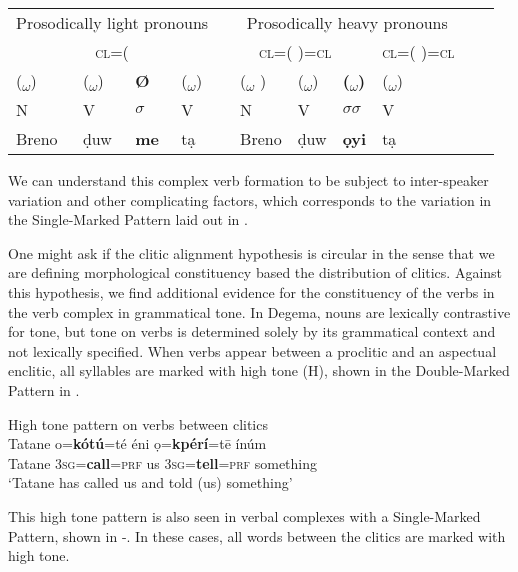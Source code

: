 \documentclass[output=paper]{langsci/langscibook}
\begin{document}
\ea\label{ex:rolle:48}
\begin{tabular}{lllllllllll}
\multicolumn{4}{c}{Prosodically light pronouns}  
&&
\multicolumn{4}{c}{Prosodically heavy pronouns}
\\  
\multicolumn{4}{c}{\textsc{cl}=( }       )=\textsc{cl} 
&
\multicolumn{4}{c}{\textsc{cl}=({ })=\textsc{cl}}  & \textsc{cl}=(  )=\textsc{cl}
\\
(\textsubscript{$\omega $}) &
(\textsubscript{$\omega $}) &
\textbf{Ø}  &
(\textsubscript{$\omega $}) & 
& 
(\textsubscript{$\omega $} ) &
(\textsubscript{$\omega $}) &
\textbf{(\textsubscript{$\omega $})} &
(\textsubscript{$\omega $})\\
 N      & V     & \textbf{$\sigma $} &  V   && N      & V    & \textbf{$\sigma \sigma $}   &   V\\
 Breno  & ḍuw   & \textbf{me}        &  tạ  && Breno  & ḍuw  & \textbf{ọyi}                &  tạ\\ 
\end{tabular}

\z

We can understand this complex verb formation to be subject to inter-speaker variation and other complicating factors, which corresponds to the variation in the Single-Marked Pattern laid out in .

One might ask if the clitic alignment hypothesis is circular in the sense that we are defining morphological constituency based the distribution of clitics. Against this hypothesis, we find additional evidence for the constituency of the verbs in the verb complex in grammatical tone. In Degema, nouns are lexically contrastive for tone, but tone on verbs is determined solely by its grammatical context and not lexically specified. When verbs appear between a proclitic and an aspectual enclitic, all syllables are marked with high tone (H), shown in the Double-Marked Pattern in .

\ea\label{ex:rolle:49}
{High tone pattern on verbs between clitics}\\
\gll  Tatane  o=\textbf{kótú}=té     éni   ọ=\textbf{kpérí}=tē     ínúm\\
     Tatane  3\textsc{sg}=\textbf{call}=\textsc{prf}   us   3\textsc{sg}=\textbf{tell}=\textsc{prf}  something\\
\glt ‘Tatane has called us and told (us) something’ \citep[285]{Kari2003a} 
\z

This high tone pattern is also seen in verbal complexes with a Single-Marked Pattern, shown in -. In these cases, all words between the clitics are marked with high tone. 
\end{document}
